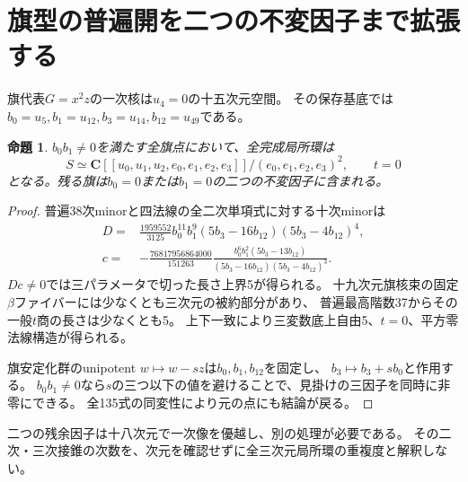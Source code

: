 \documentclass[11pt,a4paper]{ltjsarticle}
\newcommand{\CC}{\mathbf C}
\newtheorem{proposition}[theorem]{命題}
\theoremstyle{remark}
\begin{document}
\section{旗型の普遍開を二つの不変因子まで拡張する}
旗代表$G=x^2z$の一次核は$u_4=0$の十五次元空間。
その保存基底では$b_0=u_5,b_1=u_{12},b_3=u_{14},b_{12}=u_{49}$である。
\begin{proposition}
$b_0b_1\ne0$を満たす全旗点において、全完成局所環は
\[
 S\simeq\CC[[u_0,u_1,u_2,e_0,e_1,e_2,e_3]]/(e_0,e_1,e_2,e_3)^2,
 \qquad t=0
\]
となる。残る旗は$b_0=0$または$b_1=0$の二つの不変因子に含まれる。
\end{proposition}
\begin{proof}
普遍38次minorと四法線の全二次単項式に対する十次minorは
\begin{align*}
D={}&\frac{1959552}{3125}b_0^{11}b_1^9(5b_3-16b_{12})(5b_3-4b_{12})^4,\\
c={}&-\frac{76817956864000}{151263}
\frac{b_0^6b_1^2(5b_3-13b_{12})}{(5b_3-16b_{12})(5b_3-4b_{12})^3}.
\end{align*}
$Dc\ne0$では三パラメータで切った長さ上界5が得られる。
十九次元旗核束の固定$\beta$ファイバーには少なくとも三次元の被約部分があり、
普遍最高階数37からその一般$t$商の長さは少なくとも5。
上下一致により三変数底上自由5、$t=0$、平方零法線構造が得られる。

旗安定化群のunipotent $w\mapsto w-sz$は$b_0,b_1,b_{12}$を固定し、
$b_3\mapsto b_3+sb_0$と作用する。
$b_0b_1\ne0$なら$s$の三つ以下の値を避けることで、見掛けの三因子を同時に非零にできる。
全135式の同変性により元の点にも結論が戻る\cite{flag-open-v40}。
\end{proof}
二つの残余因子は十八次元で一次像を優越し、別の処理が必要である。
その二次・三次接錐の次数を、次元を確認せずに全三次元局所環の重複度と解釈しない。
\end{document}
